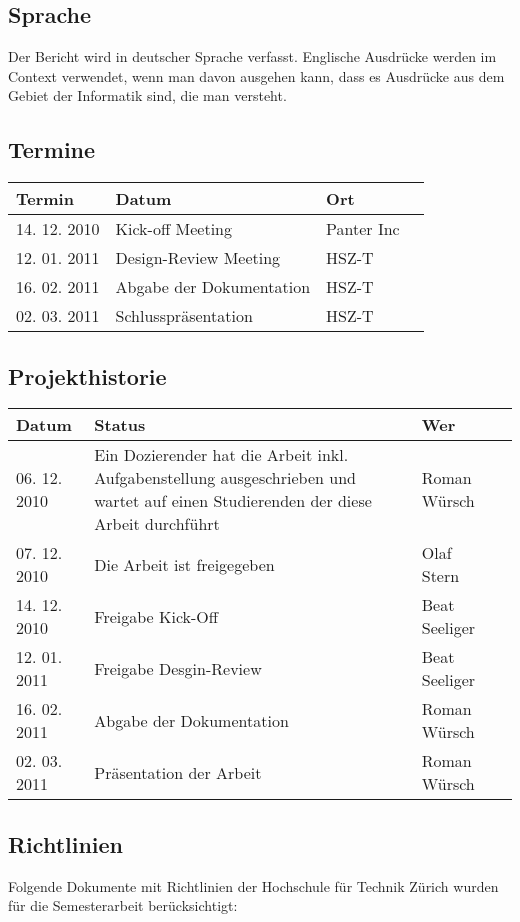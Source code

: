 \documentclass[listof=totocnumbered, bibliography=totocnumbered]{scrreprt}
\begin{document}
  \subsection{Sprache}
  
  Der Bericht wird in deutscher Sprache verfasst. Englische Ausdrücke werden im
  Context verwendet, wenn man davon ausgehen kann, dass es Ausdrücke aus dem
  Gebiet der Informatik sind, die man versteht.
  
  \subsection{Termine}
  
  \begin{tabular}{lp{10cm}ll}
    \toprule
    Termin & Datum & Ort \\
    \midrule
    14. 12. 2010 & Kick-off Meeting & Panter Inc\\
    12. 01. 2011 & Design-Review Meeting & HSZ-T\\
    16. 02. 2011 & Abgabe der Dokumentation & HSZ-T\\
    02. 03. 2011 & Schlusspräsentation & HSZ-T\\
    \bottomrule
  \end{tabular}
  
  \subsection{Projekthistorie}
  
  \begin{tabular}{lp{10cm}ll}
    \toprule
    Datum & Status & Wer \\
    \midrule
    06. 12. 2010 & Ein Dozierender hat die Arbeit inkl. Aufgabenstellung
    ausgeschrieben und wartet auf einen Studierenden der diese Arbeit
    durchführt & Roman Würsch\\
    07. 12. 2010 & Die Arbeit ist freigegeben & Olaf Stern\\
    14. 12. 2010 & Freigabe Kick-Off & Beat Seeliger\\
    12. 01. 2011 & Freigabe Desgin-Review & Beat Seeliger\\
    16. 02. 2011 & Abgabe der Dokumentation & Roman Würsch\\
    02. 03. 2011 & Präsentation der Arbeit & Roman Würsch\\
    \bottomrule
  \end{tabular}
  
  \subsection{Richtlinien}
  Folgende Dokumente mit Richtlinien der Hochschule für Technik Zürich 
  wurden für die Semesterarbeit berücksichtigt:
\end{document}
